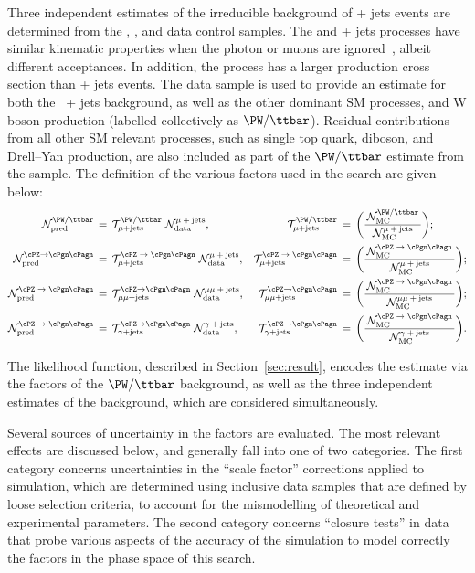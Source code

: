 Three independent estimates of the irreducible background of \znunu +
jets events are determined from the \gj, \mmj, and \mj data control
samples. The \gj and \zmumu + jets processes have similar kinematic
properties when the photon or muons are ignored~\cite{Bern:2011pa},
albeit different acceptances. In addition, the \gj process has a
larger production cross section than \znunu + jets events. The \mj
data sample is used to provide an estimate for both the \znunu\ + jets
background, as well as the other dominant SM processes, \ttbar and W
boson production (labelled collectively as $\PW/\ttbar$). Residual
contributions from all other SM relevant processes, such as single top
quark, diboson, and Drell--Yan production, are also included as part
of the $\PW/\ttbar$ estimate from the \mj sample. The definition of
the various \tf factors used in the search are given below:
\begin{align}
  \mathcal{N}^\text{\PW/\ttbar}_\text{pred} \, & = \,
  \tf^\text{\PW/\ttbar}_{\mj} \;
  \mathcal{N}^\text{\mj}_\text{data}, &
  \tf^\text{\PW/\ttbar}_{\mj} \, & = \,
  \bigg(
  \frac{\,\mathcal{N}^{\PW/\ttbar}_\text{MC}\,}
  {\mathcal{N}^\text{\mj}_\text{MC}}
  \bigg); \\
  \mathcal{N}^{\znunu}_\text{pred} \, & = \,
  \tf^{\text{\znunu}}_{\mj} \;
  \mathcal{N}^\text{\mj}_\text{data}, &
  \tf^{\text{\znunu}}_{\mj} \, & = \,
  \bigg(
  \frac{\,\mathcal{N}^\text{\znunu}_\text{MC}\,}
  {\mathcal{N}^\text{\mj}_\text{MC}}
  \bigg); \\
  \mathcal{N}^\text{\znunu}_\text{pred} \, & = \,
  \tf^{\znunu}_{\mmj}  \;
  \mathcal{N}^\text{\mmj}_\text{data}, &
  \tf^{\znunu}_{\mmj}  \, & = \,
  \bigg(
  \frac{\,\mathcal{N}^\text{\znunu}_\text{MC}\,}
  {\mathcal{N}^\text{\mmj}_\text{MC}}
  \bigg); \\
  \mathcal{N}^\text{\znunu}_\text{pred} \, & = \,
  \tf^{\znunu}_{\gj}  \;
  \mathcal{N}^\text{\gj}_\text{data}, &
  \tf^{\znunu}_{\gj}  \, & = \,
  \bigg(
  \frac{\,\mathcal{N}^\text{\znunu}_\text{MC}\,}
  {\mathcal{N}^\text{\gj}_\text{MC}}
  \bigg).
\end{align}

The likelihood function, described in Section~\ref{sec:result},
encodes the estimate via the \tf factors of the $\PW/\ttbar$ background, as
well as the three independent estimates of the \znunu background,
which are considered simultaneously.

Several sources of uncertainty in the \tf factors are evaluated.  The most
relevant effects are discussed below, and generally fall into one of
two categories. The first category concerns uncertainties in the
``scale factor'' corrections applied to simulation, which are
determined using inclusive data samples that are defined by loose
selection criteria, to account for the mismodelling of theoretical and
experimental parameters. The second category concerns ``closure
tests'' in data that probe various aspects of the accuracy of the
simulation to model correctly the \tf factors in the phase space of this
search.

